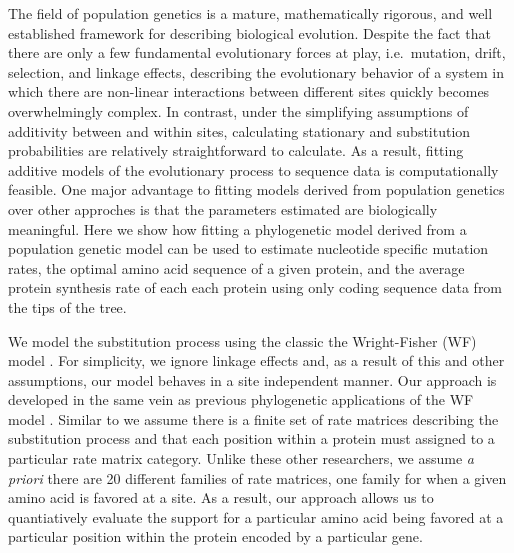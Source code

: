 \documentclass{article}
\newcommand{\Ne}{\ensuremath{{N_e}}\xspace} %
\begin{document}
The field of population genetics is a mature, mathematically rigorous, and well established framework for describing biological evolution.
Despite the fact that there are only a few fundamental evolutionary forces at play, i.e.~mutation, drift, selection, and linkage effects, describing the evolutionary behavior of a system in which there are non-linear interactions between different sites quickly becomes overwhelmingly complex.
In contrast, under the simplifying assumptions of additivity between and within sites, calculating stationary and substitution probabilities are relatively straightforward to calculate.
As a result, fitting additive models of the evolutionary process to sequence data is computationally feasible.
One major advantage to fitting models derived from population genetics over other approches is that the parameters estimated are biologically meaningful. %
Here we show how fitting a phylogenetic model derived from a population genetic model can be used to estimate nucleotide specific mutation rates, the optimal amino acid sequence of a given protein, and the average protein synthesis rate of each each protein using only coding sequence data from the tips of the tree.

We model the substitution process using the classic the Wright-Fisher (WF) model \citep{Kimura1962,Wright1969,Iwasa1988,BergAndLassig2003,SellaAndHirsh2005}.
For simplicity, we ignore linkage effects and, as a result of this and other assumptions, our model behaves in a site independent manner.
Our approach is developed in the same vein as previous phylogenetic applications of the WF model \citep[e.g.][]{MuseAndGaut1994,HalpernAndBruno1998,YangAndNielsen2008,RodrigueEtAl2005,KoshiAndGoldstein1997,KoshiEtAl1999,DimmicEtAl2000,ThorneEtAl2012,LartillotAndPhilippe2004,RodrigueAndLartillot2014}. %
Similar to \citet{LartillotAndPhilippe2004,RodrigueAndLartillot2014} we assume there is a finite set of rate matrices describing the substitution process and that each position within a protein must assigned to a particular rate matrix category.%
Unlike these other researchers, we assume \emph{a priori} there are 20 different families of rate matrices, one family for when a given amino acid is favored at a site.
As a result, our approach allows us to quantiatively evaluate the support for a particular amino acid being favored at a particular position within the protein encoded by a particular gene.
\end{document}

